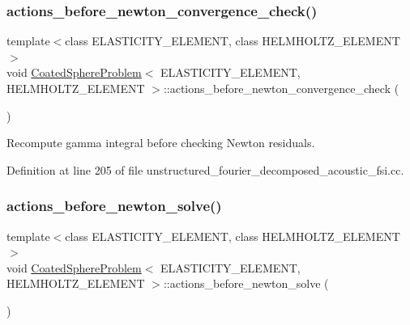 \subsubsection{\texorpdfstring{actions\+\_\+before\+\_\+newton\+\_\+convergence\+\_\+check()}{actions\_before\_newton\_convergence\_check()}\hspace{0.1cm}{\footnotesize\ttfamily [2/2]}}
{\footnotesize\ttfamily template$<$class E\+L\+A\+S\+T\+I\+C\+I\+T\+Y\+\_\+\+E\+L\+E\+M\+E\+NT, class H\+E\+L\+M\+H\+O\+L\+T\+Z\+\_\+\+E\+L\+E\+M\+E\+NT$>$ \\
void \hyperlink{classCoatedSphereProblem}{Coated\+Sphere\+Problem}$<$ E\+L\+A\+S\+T\+I\+C\+I\+T\+Y\+\_\+\+E\+L\+E\+M\+E\+NT, H\+E\+L\+M\+H\+O\+L\+T\+Z\+\_\+\+E\+L\+E\+M\+E\+NT $>$\+::actions\+\_\+before\+\_\+newton\+\_\+convergence\+\_\+check (\begin{DoxyParamCaption}{ }\end{DoxyParamCaption})\hspace{0.3cm}{\ttfamily [inline]}}



Recompute gamma integral before checking Newton residuals. 



Definition at line 205 of file unstructured\+\_\+fourier\+\_\+decomposed\+\_\+acoustic\+\_\+fsi.\+cc.

\mbox{\label{classCoatedSphereProblem_aa268009485d4d2bb6b4856bfa318aaa9}} 
\subsubsection{\texorpdfstring{actions\+\_\+before\+\_\+newton\+\_\+solve()}{actions\_before\_newton\_solve()}\hspace{0.1cm}{\footnotesize\ttfamily [1/2]}}
{\footnotesize\ttfamily template$<$class E\+L\+A\+S\+T\+I\+C\+I\+T\+Y\+\_\+\+E\+L\+E\+M\+E\+NT, class H\+E\+L\+M\+H\+O\+L\+T\+Z\+\_\+\+E\+L\+E\+M\+E\+NT$>$ \\
void \hyperlink{classCoatedSphereProblem}{Coated\+Sphere\+Problem}$<$ E\+L\+A\+S\+T\+I\+C\+I\+T\+Y\+\_\+\+E\+L\+E\+M\+E\+NT, H\+E\+L\+M\+H\+O\+L\+T\+Z\+\_\+\+E\+L\+E\+M\+E\+NT $>$\+::actions\+\_\+before\+\_\+newton\+\_\+solve (\begin{DoxyParamCaption}{ }\end{DoxyParamCaption})\hspace{0.3cm}{\ttfamily [inline]}}




